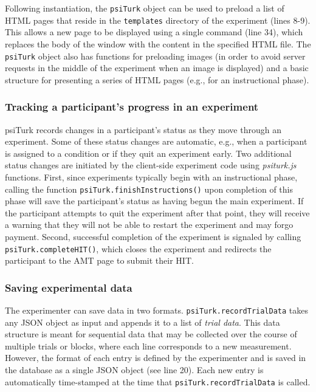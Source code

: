 \documentclass[twocolumn]{svjour3}          %
\newcommand{\psiturk}[0]{\textsf{psiTurk}}
\newcommand{\psiturkjs}[0]{\emph{psiturk.js}}
\begin{document}
Following instantiation, the \texttt{psiTurk} object can be used to preload a list of HTML pages that reside in the \texttt{templates} directory of the experiment (lines 8-9).
This allows a new page to be displayed using a single command (line 34), which replaces the body of the window with the content in the specified HTML file.
The \texttt{psiTurk} object also has functions for preloading images (in order to avoid server requests in the middle of the experiment when an image is displayed) and a basic structure for presenting a series of HTML pages (e.g., for an instructional phase).

\subsubsection{Tracking a participant's progress in an experiment} 

\psiturk{} records changes in a participant's status as they move through an experiment. 
Some of these status changes are automatic, e.g., when a participant is assigned to a condition or if they quit an experiment early. 
Two additional status changes are initiated by the client-side experiment code using \psiturkjs{} functions.
First, since experiments typically begin with an instructional phase, calling the function \texttt{psiTurk.finishInstructions()} upon completion of this phase will save the participant's status as having begun the main experiment.
If the participant attempts to quit the experiment after that point, they will receive a warning that they will not be able to restart the experiment and may forgo payment.
Second, successful completion of the experiment is signaled by calling \texttt{psiTurk.completeHIT()}, which closes the experiment and redirects the participant to the AMT page to submit their HIT.

\subsubsection{Saving experimental data} 

The experimenter can save data in two formats.
\texttt{psiTurk.recordTrialData} takes any JSON object as input and appends it to a list of \emph{trial data}.
This data structure is meant for sequential data that may be collected over the course of multiple trials or blocks, where each line corresponds to a new measurement.
However, the format of each entry is defined by the experimenter and is saved in the database as a single JSON object (see line 20).
Each new entry is automatically time-stamped at the time that \texttt{psiTurk.recordTrialData} is called.
\end{document}
